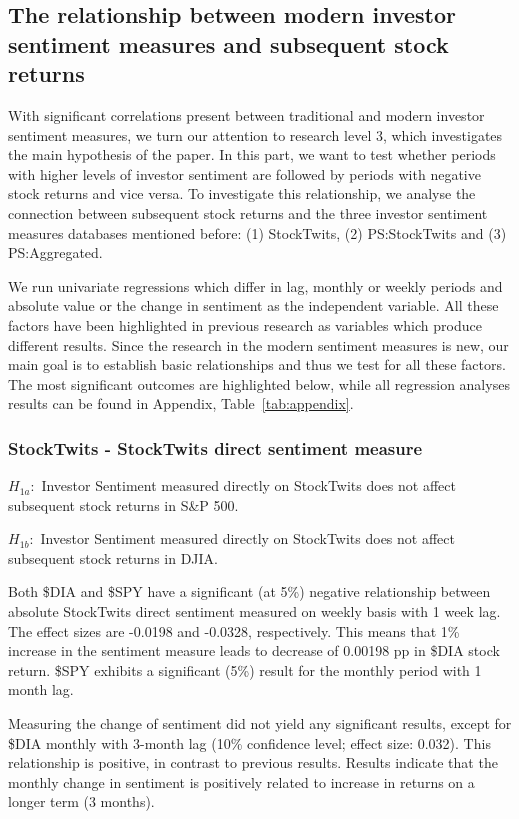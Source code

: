 \subsection{The relationship between modern investor sentiment measures and subsequent stock returns}

With significant correlations present between traditional and modern investor sentiment measures, we turn our attention to research level 3, which investigates the main hypothesis of the paper. In this part, we want to test whether periods with higher levels of investor sentiment are followed by periods with negative stock returns and vice versa. To investigate this relationship, we analyse the connection between subsequent stock returns and the three investor sentiment measures databases mentioned before: (1) StockTwits, (2) PS:StockTwits and (3) PS:Aggregated.
\par
We run univariate regressions which differ in lag, monthly or weekly periods and absolute value or the change in sentiment as the independent variable. All these factors have been highlighted in previous research as variables which produce different results. Since the research in the modern sentiment measures is new, our main goal is to establish basic relationships and thus we test for all these factors. The most significant outcomes are highlighted below, while all regression analyses results can be found in Appendix, Table~\ref{tab:appendix}.

\subsubsection{StockTwits - StockTwits direct sentiment measure}

\begin{center}

\itshape{
$H_{1a}:$ Investor Sentiment measured directly on StockTwits does not affect subsequent stock returns in S\&P 500.


$H_{1b}:$ Investor Sentiment measured directly on StockTwits does not affect subsequent stock returns in DJIA.
}

\end{center}

Both \$DIA and \$SPY have a significant (at 5\%) negative relationship between absolute StockTwits direct sentiment measured on weekly basis with 1 week lag. The effect sizes are -0.0198 and -0.0328, respectively. This means that 1\% increase in the sentiment measure leads to decrease of 0.00198 pp in \$DIA stock return. \$SPY exhibits a significant (5\%) result for the monthly period with 1 month lag. 
\par
Measuring the change of sentiment did not yield any significant results, except for \$DIA monthly with 3-month lag (10\% confidence level; effect size: 0.032). This relationship is positive, in contrast to previous results. Results indicate that the monthly change in sentiment is positively related to increase in returns on a longer term (3 months).

